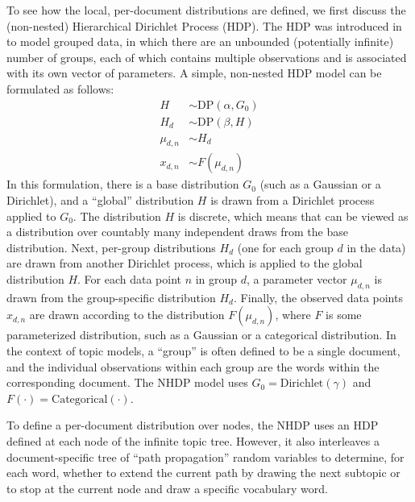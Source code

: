 \documentclass{article}
\begin{document}
To see how the local, per-document distributions are defined, we first discuss the (non-nested) Hierarchical Dirichlet Process (HDP).
The HDP was introduced in \cite{teh2005hdp} to model grouped data, in which there are an unbounded (potentially infinite) number of groups, each of which contains multiple observations and is associated with its own vector of parameters.
A simple, non-nested HDP model can be formulated as follows:
\begin{align}
H &\sim \text{DP}(\alpha, G_0) \\
H_d &\sim \text{DP}(\beta, H) \\
\mu_{d,n} &\sim H_d \\
x_{d,n} &\sim F(\mu_{d,n})
\end{align}
In this formulation, there is a base distribution $G_0$ (such as a Gaussian or a Dirichlet), and a ``global'' distribution $H$ is drawn from a Dirichlet process applied to $G_0$.
The distribution $H$ is discrete, which means that can be viewed as a distribution over countably many independent draws from the base distribution.
Next, per-group distributions $H_d$ (one for each group $d$ in the data) are drawn from another Dirichlet process, which is applied to the global distribution $H$.
For each data point $n$ in group $d$, a parameter vector $\mu_{d,n}$ is drawn from the group-specific distribution $H_d$.
Finally, the observed data points $x_{d,n}$ are drawn according to the distribution $F(\mu_{d,n})$, where $F$ is some parameterized distribution, such as a Gaussian or a categorical distribution.
In the context of topic models, a ``group'' is often defined to be a single document, and the individual observations within each group are the words within the corresponding document.
The NHDP model uses $G_0 = \text{Dirichlet}(\gamma)$ and $F(\cdot) = \text{Categorical}(\cdot)$.

To define a per-document distribution over nodes, the NHDP uses an HDP defined at each node of the infinite topic tree.
However, it also interleaves a document-specific tree of ``path propagation'' random variables to determine, for each word, whether to extend the current path by drawing the next subtopic or to stop at the current node and draw a specific vocabulary word.
\end{document}
